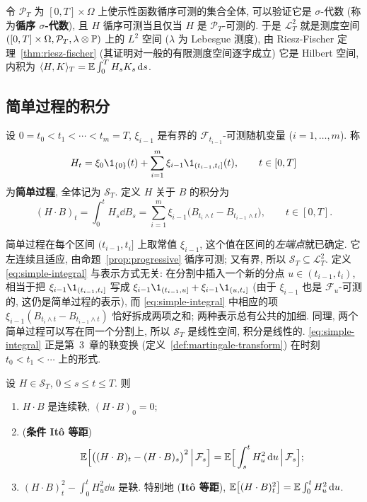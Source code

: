令 $\mathcal{P}_T$ 为 $[0,T]\times\Omega$ 上使示性函数循序可测的集合全体, 可以验证它是 $\sigma$-代数 (称为\textbf{循序 $\sigma$-代数}), 且 $H$ 循序可测当且仅当 $H$ 是 $\mathcal{P}_T$-可测的. 于是 $\mathscr{L}^2_T$ 就是测度空间 $([0,T]\times\Omega,\mathcal{P}_T,\lambda\otimes\P)$ 上的 $L^2$ 空间 ($\lambda$ 为 Lebesgue 测度), 由 Riesz-Fischer 定理~\ref{thm:riesz-fischer} (其证明对一般的有限测度空间逐字成立) 它是 Hilbert 空间, 内积为 $\ip{H,K}_T=\E\int_0^TH_sK_s\dd s$.

\subsection{简单过程的积分}

\begin{definition}[简单过程]\label{def:simple-process}
设 $0=t_0<t_1<\cdots<t_m=T$, $\xi_{i-1}$ 是有界的 $\mathcal{F}_{t_{i-1}}$-可测随机变量 ($i=1,\dots,m$). 称
\[
H_t=\xi_0\1_{\{0\}}(t)+\sum_{i=1}^m\xi_{i-1}\1_{(t_{i-1},t_i]}(t),\qquad t\in[0,T]
\]
为\textbf{简单过程}, 全体记为 $\mathscr{S}_T$. 定义 $H$ 关于 $B$ 的积分为
\begin{equation}\label{eq:simple-integral}
(H\cdot B)_t=\int_0^tH_s\dd B_s=\sum_{i=1}^m\xi_{i-1}\big(B_{t_i\wedge t}-B_{t_{i-1}\wedge t}\big),\qquad t\in[0,T].
\end{equation}
\end{definition}

简单过程在每个区间 $(t_{i-1},t_i]$ 上取常值 $\xi_{i-1}$, 这个值在区间的\emph{左端点}就已确定. 它左连续且适应, 由命题~\ref{prop:progressive} 循序可测; 又有界, 所以 $\mathscr{S}_T\subseteq\mathscr{L}^2_T$. 定义 \eqref{eq:simple-integral} 与表示方式无关: 在分割中插入一个新的分点 $u\in(t_{i-1},t_i)$, 相当于把 $\xi_{i-1}\1_{(t_{i-1},t_i]}$ 写成 $\xi_{i-1}\1_{(t_{i-1},u]}+\xi_{i-1}\1_{(u,t_i]}$ (由于 $\xi_{i-1}$ 也是 $\mathcal{F}_u$-可测的, 这仍是简单过程的表示), 而 \eqref{eq:simple-integral} 中相应的项 $\xi_{i-1}(B_{t_i\wedge t}-B_{t_{i-1}\wedge t})$ 恰好拆成两项之和; 两种表示总有公共的加细. 同理, 两个简单过程可以写在同一个分割上, 所以 $\mathscr{S}_T$ 是线性空间, 积分是线性的. \eqref{eq:simple-integral} 正是第~3~章的鞅变换 (定义~\ref{def:martingale-transform}) 在时刻 $t_0<t_1<\cdots$ 上的形式.

\begin{proposition}[简单过程的 It\^o 积分]\label{prop:simple-integral}
设 $H\in\mathscr{S}_T$, $0\le s\le t\le T$. 则
\begin{enumerate}
\item $H\cdot B$ 是连续鞅, $(H\cdot B)_0=0$;
\item (\textbf{条件 It\^o 等距})
\[
\E\Big[\big((H\cdot B)_t-(H\cdot B)_s\big)^2\,\Big|\,\mathcal{F}_s\Big]=\E\Big[\int_s^tH_u^2\dd u\,\Big|\,\mathcal{F}_s\Big];
\]
\item $(H\cdot B)_t^2-\int_0^tH_u^2\dd u$ 是鞅. 特别地 (\textbf{It\^o 等距}), $\E\big[(H\cdot B)_t^2\big]=\E\int_0^tH_u^2\dd u$.
\end{enumerate}
\end{proposition}

